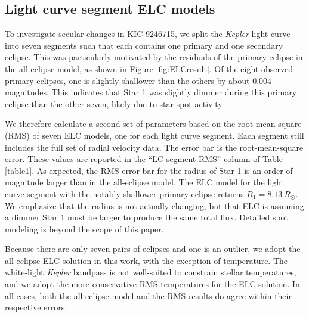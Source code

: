 \subsection{Light curve segment ELC models}
To investigate secular changes in KIC 9246715, we split the \emph{Kepler} light curve into seven segments such that each contains one primary and one secondary eclipse. This was particularly motivated by the residuals of the primary eclipse in the all-eclipse model, as shown in Figure \ref{fig:ELCresult}. Of the eight observed primary eclipses, one is slightly shallower than the others by about 0.004 magnitudes. This indicates that Star 1 was slightly dimmer during this primary eclipse than the other seven, likely due to star spot activity.

We therefore calculate a second set of parameters based on the root-mean-square (RMS) of seven ELC models, one for each light curve segment. Each segment still includes the full set of radial velocity data. The error bar is the root-mean-square error. These values are reported in the ``LC segment RMS'' column of Table \ref{table1}. As expected, the RMS error bar for the radius of Star 1 is an order of magnitude larger than in the all-eclipse model. The ELC model for the light curve segment with the notably shallower primary eclipse returns $R_1 = 8.13 \ R_{\odot}$. We emphasize that the radius is not actually changing, but that ELC is assuming a dimmer Star 1 must be larger to produce the same total flux. Detailed spot modeling is beyond the scope of this paper.

Because there are only seven pairs of eclipses and one is an outlier, we adopt the all-eclipse ELC solution in this work, with the exception of temperature. The white-light \emph{Kepler} bandpass is not well-suited to constrain stellar temperatures, and we adopt the more conservative RMS temperatures for the ELC solution. In all cases, both the all-eclipse model and the RMS results do agree within their respective errors.
    